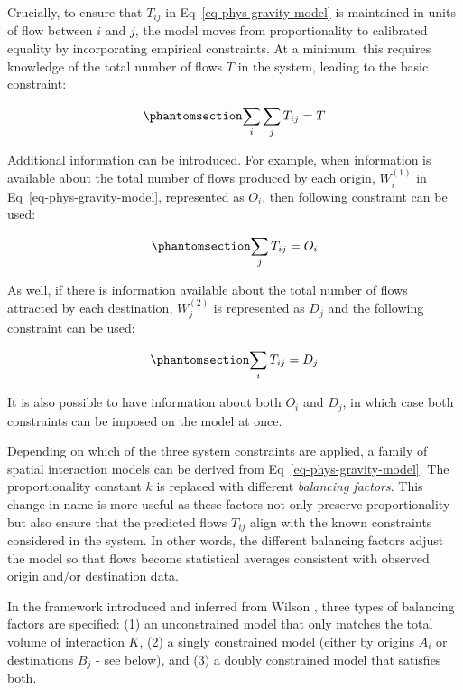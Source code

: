 \documentclass[
  10pt,
  letterpaper,
]{article}
\begin{document}
Crucially, to ensure that \(T_{ij}\) in Eq~\ref{eq-phys-gravity-model}
is maintained in units of flow between \(i\) and \(j\), the model moves
from proportionality to calibrated equality by incorporating empirical
constraints. At a minimum, this requires knowledge of the total number
of flows \(T\) in the system, leading to the basic constraint:

\begin{equation}\phantomsection\label{eq-constraint0-gravitymodel}{
\sum_i\sum_j T_{ij} = T
}\end{equation}

Additional information can be introduced. For example, when information
is available about the total number of flows produced by each origin,
\(W_i^{(1)}\) in Eq~\ref{eq-phys-gravity-model}, represented as \(O_i\),
then following constraint can be used:

\begin{equation}\phantomsection\label{eq-constraint1-gravitymodel}{
\sum_j T_{ij} = O_i
}\end{equation}

As well, if there is information available about the total number of
flows attracted by each destination, \(W_j^{(2)}\) is represented as
\(D_j\) and the following constraint can be used:

\begin{equation}\phantomsection\label{eq-constraint2-gravitymodel}{
\sum_i T_{ij} = D_j
}\end{equation}

It is also possible to have information about both \(O_i\) and \(D_j\),
in which case both constraints can be imposed on the model at once.

Depending on which of the three system constraints are applied, a family
of spatial interaction models can be derived from
Eq~\ref{eq-phys-gravity-model}. The proportionality constant \(k\) is
replaced with different \emph{balancing factors}. This change in name is
more useful as these factors not only preserve proportionality but also
ensure that the predicted flows \(T_{ij}\) align with the known
constraints considered in the system. In other words, the different
balancing factors adjust the model so that flows become statistical
averages consistent with observed origin and/or destination data.

In the framework introduced and inferred from Wilson \citep{wilson1971},
three types of balancing factors are specified: (1) an unconstrained
model that only matches the total volume of interaction \(K\), (2) a
singly constrained model (either by origins \(A_i\) or destinations
\(B_j\) - see below), and (3) a doubly constrained model that satisfies
both.
\end{document}
